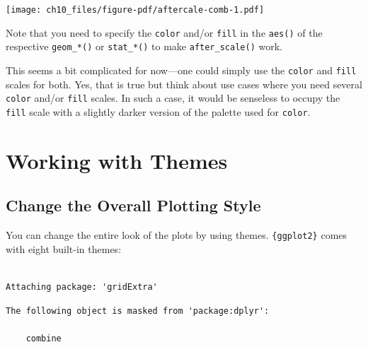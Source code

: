 \documentclass[
  letterpaper,
]{scrbook}
\begin{document}
\texttt{[image: ch10\_files/figure-pdf/aftercale-comb-1.pdf]}

Note that you need to specify the \texttt{color} and/or \texttt{fill} in
the \texttt{aes()} of the respective \texttt{geom\_*()} or
\texttt{stat\_*()} to make \texttt{after\_scale()} work.

\begin{tcolorbox}[enhanced jigsaw, rightrule=.15mm, arc=.35mm, title=\textcolor{quarto-callout-important-color}{\faExclamation}\hspace{0.5em}{Important}, colback=white, toptitle=1mm, colbacktitle=quarto-callout-important-color!10!white, breakable, left=2mm, opacityback=0, leftrule=.75mm, bottomrule=.15mm, bottomtitle=1mm, colframe=quarto-callout-important-color-frame, coltitle=black, toprule=.15mm, opacitybacktitle=0.6, titlerule=0mm]

This seems a bit complicated for now---one could simply use the
\texttt{color} and \texttt{fill} scales for both. Yes, that is true but
think about use cases where you need several \texttt{color} and/or
\texttt{fill} scales. In such a case, it would be senseless to occupy
the \texttt{fill} scale with a slightly darker version of the palette
used for \texttt{color}.

\end{tcolorbox}


\chapter{Working with Themes}\label{themes}

\section{Change the Overall Plotting
Style}\label{change-the-overall-plotting-style}

You can change the entire look of the plots by using themes.
\texttt{\{ggplot2\}} comes with eight built-in themes:

\begin{verbatim}

Attaching package: 'gridExtra'
\end{verbatim}

\begin{verbatim}
The following object is masked from 'package:dplyr':

    combine
\end{verbatim}
\end{document}
